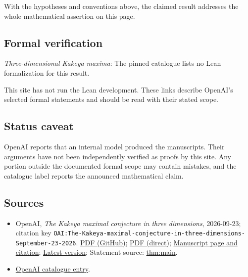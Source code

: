 \documentclass[11pt]{article}
\begin{document}
With the hypotheses and conventions above, the claimed result addresses the whole mathematical assertion on this page.

\subsection{Formal verification}
\textit{Three-dimensional Kakeya maxima}: The pinned catalogue lists no Lean formalization for this result.

This site has not run the Lean development. These links describe OpenAI’s selected formal statements and should be read with their stated scope.

\subsection{Status caveat}
OpenAI reports that an internal model produced the manuscripts. Their arguments have not been independently verified as proofs by this site. Any portion outside the documented formal scope may contain mistakes, and the catalogue label reports the announced mathematical claim.

\subsection{Sources}
\begin{itemize}
\item OpenAI, \emph{The Kakeya maximal conjecture in three dimensions}, 2026-09-23; citation key \texttt{OAI:The-Kakeya-maximal-conjecture-in-three-dimensions-September-23-2026}. \href{https://github.com/openai/math/blob/adc7f1241b42e322a6451854ab7e4b4c146bf78a/preprints/The-Kakeya-maximal-conjecture-in-three-dimensions-September-23-2026/paper.pdf}{PDF (GitHub)}; \href{https://github.com/openai/math/raw/adc7f1241b42e322a6451854ab7e4b4c146bf78a/preprints/The-Kakeya-maximal-conjecture-in-three-dimensions-September-23-2026/paper.pdf}{PDF (direct)}; \href{https://github.com/openai/math/blob/adc7f1241b42e322a6451854ab7e4b4c146bf78a/preprints/The-Kakeya-maximal-conjecture-in-three-dimensions-September-23-2026/README.md}{Manuscript page and citation}; \href{https://github.com/openai/math/blob/main/preprints/The-Kakeya-maximal-conjecture-in-three-dimensions-September-23-2026/paper.pdf}{Latest version}; Statement source: \href{https://github.com/openai/math/blob/adc7f1241b42e322a6451854ab7e4b4c146bf78a/preprints/The-Kakeya-maximal-conjecture-in-three-dimensions-September-23-2026/build/sections/introduction.tex\#L17}{thm:main}.
\item \href{https://github.com/openai/math/blob/adc7f1241b42e322a6451854ab7e4b4c146bf78a/CONTENTS.md}{OpenAI catalogue entry}.
\end{itemize}
\end{document}
